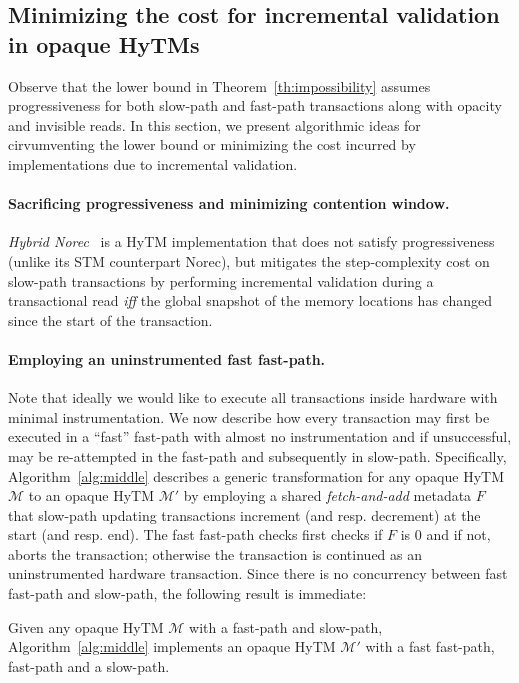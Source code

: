 \subsection{Minimizing the cost for incremental validation in opaque HyTMs}
\label{sec:middlepath}
%
%
Observe that the lower bound in Theorem~\ref{th:impossibility} assumes progressiveness for both slow-path and fast-path transactions
along with opacity and invisible reads.
In this section, we present algorithmic ideas for cirvumventing the lower bound or minimizing the cost incurred
by implementations due to incremental validation.

\paragraph{Sacrificing progressiveness and minimizing contention window.}
%
\emph{Hybrid Norec}~\cite{hybridnorec} is a HyTM implementation that does not satisfy progressiveness
(unlike its STM counterpart Norec), but mitigates
the step-complexity cost on slow-path transactions by performing incremental validation during a transactional read \emph{iff} 
the global snapshot of the memory locations has changed since the start of the transaction.
%


\paragraph{Employing an uninstrumented fast fast-path.}
Note that ideally we would like to execute all transactions inside hardware with minimal instrumentation.
We now describe how every transaction may first be executed in a ``fast'' fast-path with almost no instrumentation
and if unsuccessful, may be re-attempted in the fast-path and subsequently in slow-path.
Specifically, Algorithm~\ref{alg:middle} describes a generic transformation for any opaque HyTM $\mathcal{M}$ to an opaque
HyTM $\mathcal{M}'$ by employing a shared \emph{fetch-and-add} metadata $F$ that slow-path updating transactions
increment (and resp. decrement) at the start (and resp. end). The fast fast-path checks first checks if $F$ is $0$
and if not, aborts the transaction; otherwise the transaction is continued as an uninstrumented hardware transaction.
Since there is no concurrency between fast fast-path and slow-path, the following result is immediate:
%
%
\begin{theorem}
Given any opaque HyTM $\mathcal{M}$ with a fast-path and slow-path, Algorithm~\ref{alg:middle} implements an opaque HyTM $\mathcal{M}'$
with a fast fast-path, fast-path and a slow-path.
\end{theorem}
%

%